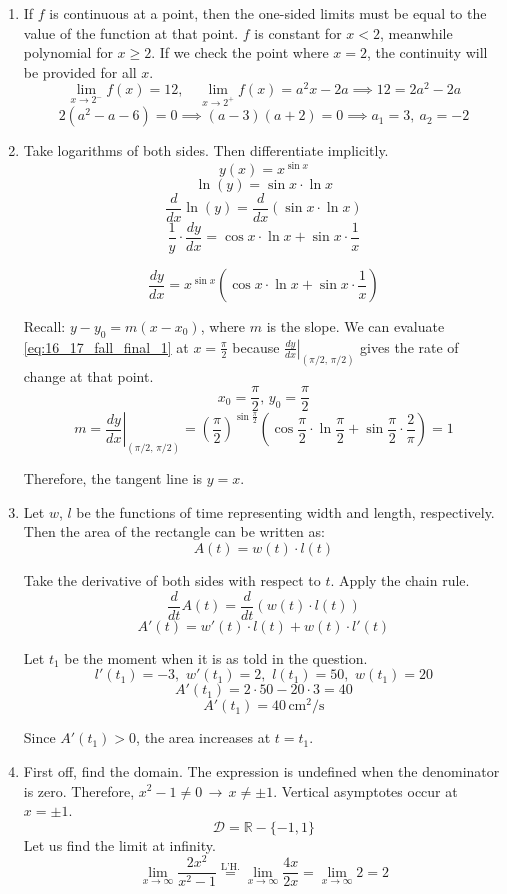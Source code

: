 \documentclass[a4paper, 12pt]{article}
\begin{document}
\begin{enumerate}[leftmargin=*,label=\textbf{\arabic*.}]
\item If $f$ is continuous at a point, then the one-sided limits must be equal to the value of the function at that point. $f$ is constant for $x < 2$, meanwhile polynomial for $x \geq 2$. If we check the point where $x=2$, the continuity will be provided for all $x$.
\[\lim_{x\to2^-}f(x)=12,\quad\lim_{x\to2^+}f(x)=a^2x-2a\implies12=2a^2-2a\]
\[2(a^2-a-6)=0\implies(a-3)(a+2)=0\implies\boxed{a_1=3,\:a_2=-2}\]

\item Take logarithms of both sides. Then differentiate implicitly.
\[y(x) = x^{\sin x}\]
\[\ln(y) = \sin x \cdot \ln x\]
\[\frac{d}{dx}\ln(y) = \frac{d}{dx}(\sin x \cdot \ln x)\]
\[\frac{1}{y} \cdot \frac{dy}{dx} =  \cos x \cdot \ln x +  \sin x \cdot \frac{1}{x}\]

\begin{equation} \frac{dy}{dx} = x^{\sin x}\left(\cos x \cdot \ln x +  \sin x \cdot \frac{1}{x}\right)\label{eq:16_17_fall_final_1}\end{equation}

Recall: $y-y_0 = m(x-x_0)$, where $m$ is the slope. We can evaluate \eqref{eq:16_17_fall_final_1} at $x = \frac{\pi}{2}$ because $\left.\frac{dy}{dx}\right|_{(\pi/2,\, \pi/2)}$ gives the rate of change at that point.
\[x_0=\frac{\pi}{2},\,y_0 = \frac{\pi}{2}\]
\[m=\left.\frac{dy}{dx}\right|_{(\pi/2,\, \pi/2)} = \left(\frac{\pi}{2}\right)^{\sin \frac{\pi}{2}}\left(\cos\frac{\pi}{2} \cdot \ln \frac{\pi}{2} + \sin \frac{\pi}{2} \cdot \frac{2}{\pi}\right) = 1\]

Therefore, the tangent line is $\boxed{y=x}$.

\item Let $w$, $l$ be the functions of time representing width and length, respectively. Then the area of the rectangle can be written as:
\[A(t) = w(t)\cdot l(t)\]

Take the derivative of both sides with respect to $t$. Apply the chain rule.
\[\frac{d}{dt}A(t) = \frac{d}{dt}(w(t)\cdot l(t))\]
\[A'(t) = w'(t)\cdot l(t) + w(t)\cdot l'(t)\]

Let $t_1$ be the moment when it is as told in the question.
\[l'(t_1) = -3,\,\,w'(t_1) = 2,\,\,l(t_1) = 50,\,\, w(t_1) = 20\]
\[A'(t_1) = 2\cdot 50 - 20\cdot 3 = 40\]
\[\boxed{A'(t_1) = 40\, \text{cm}^2/\text{s}}\]

Since $A'(t_1) > 0$, the area increases at $t=t_1$.

\item First off, find the domain. The expression is undefined when the denominator is zero. Therefore, $x^2-1 \neq 0 \,\rightarrow\, x\neq \pm 1$. Vertical asymptotes occur at $x = \pm 1$.
\[\mathcal{D} = \mathbb{R} - \{-1, 1\} \]
Let us find the limit at infinity.
\[\lim_{x\to \infty} \frac{2x^2}{x^2-1} \overset{\text{L'H.}}{=} \lim_{x\to \infty} \frac{4x}{2x} = \lim_{x\to \infty} 2 = 2\]


\end{enumerate}
\end{document}
